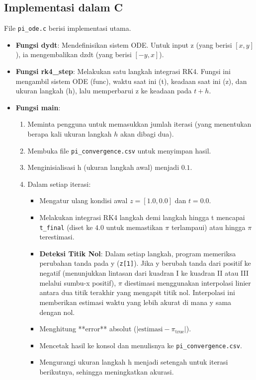 \documentclass[conference]{IEEEtran}
\begin{document}
\subsection{Implementasi dalam C}
File \texttt{pi\_ode.c} berisi implementasi utama.
\begin{itemize}
\item \textbf{Fungsi dydt}: Mendefinisikan sistem ODE. Untuk input z (yang berisi $[x, y]$), ia mengembalikan dzdt (yang berisi $[-y, x]$).
\item \textbf{Fungsi rk4\_step}: Melakukan satu langkah integrasi RK4. Fungsi ini mengambil sistem ODE (func), waktu saat ini (t), keadaan saat ini (z), dan ukuran langkah (h), lalu memperbarui z ke keadaan pada $t + h$.
\item \textbf{Fungsi main}:
\begin{enumerate}
\item Meminta pengguna untuk memasukkan jumlah iterasi (yang menentukan berapa kali ukuran langkah $h$ akan dibagi dua).
\item Membuka file \texttt{pi\_convergence.csv} untuk menyimpan hasil.
\item Menginisialisasi h (ukuran langkah awal) menjadi $0.1$.
\item Dalam setiap iterasi:
\begin{itemize}
\item Mengatur ulang kondisi awal $z = [1.0, 0.0]$ dan $t = 0.0$.
\item Melakukan integrasi RK4 langkah demi langkah hingga t mencapai \texttt{t\_final} (diset ke $4.0$ untuk memastikan $\pi$ terlampaui) atau hingga $\pi$ terestimasi.
\item \textbf{Deteksi Titik Nol}: Dalam setiap langkah, program memeriksa perubahan tanda pada y (\texttt{z[1]}). Jika y berubah tanda dari positif ke negatif (menunjukkan lintasan dari kuadran I ke kuadran II atau III melalui sumbu-x positif), $\pi$ diestimasi menggunakan interpolasi linier antara dua titik terakhir yang mengapit titik nol. Interpolasi ini memberikan estimasi waktu yang lebih akurat di mana y sama dengan nol.
\item Menghitung **error** absolut ($|\text{estimasi} - \pi_{\text{true}}|$).
\item Mencetak hasil ke konsol dan menulisnya ke \texttt{pi\_convergence.csv}.
\item Mengurangi ukuran langkah h menjadi setengah untuk iterasi berikutnya, sehingga meningkatkan akurasi.
\end{itemize}
\end{enumerate}
\end{itemize}
\end{document}
